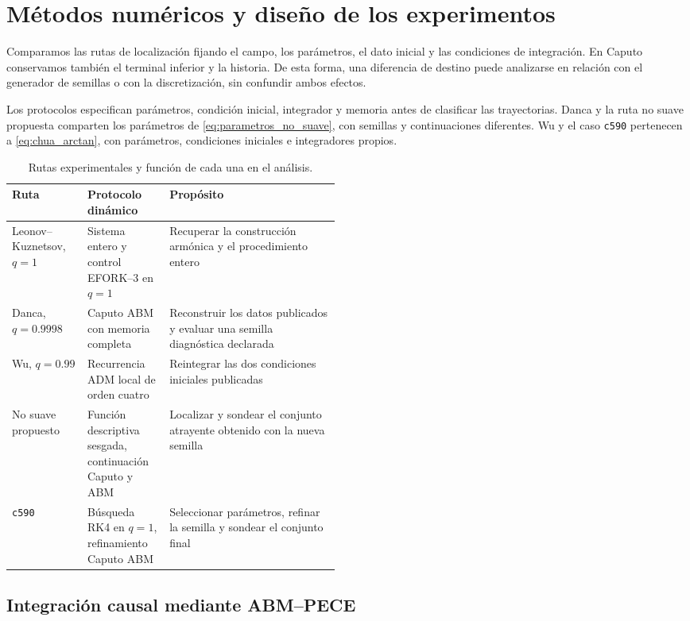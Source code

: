 \section{Métodos numéricos y diseño de los experimentos}

Comparamos las rutas de localización fijando el campo, los parámetros, el
dato inicial y las condiciones de integración. En Caputo conservamos también
el terminal inferior y la historia. De esta forma, una diferencia de destino
puede analizarse en relación con el generador de semillas o con la
discretización, sin confundir ambos efectos.
\label{sec:protocolos}

\HAFOCardProtocols

Los protocolos especifican parámetros, condición inicial, integrador y
memoria antes de clasificar las trayectorias. Danca y la ruta no suave
propuesta comparten los parámetros de \cref{eq:parametros_no_suave}, con
semillas y continuaciones diferentes. Wu y el caso \texttt{c590} pertenecen a
\cref{eq:chua_arctan}, con parámetros, condiciones iniciales e integradores
propios.

\begin{table}[H]
\centering
\caption{Rutas experimentales y función de cada una en el análisis.}
\label{tab:carriles_experimentales}
\begin{tabularx}{\linewidth}{L{0.23\linewidth}L{0.25\linewidth}Y}
\toprule
Ruta & Protocolo dinámico & Propósito\\
\midrule
Leonov--Kuznetsov, \(q=1\)
& Sistema entero y control EFORK--3 en \(q=1\)
& Recuperar la construcción armónica y el procedimiento entero\\
Danca, \(q=0.9998\)
& Caputo ABM con memoria completa
& Reconstruir los datos publicados y evaluar una semilla diagnóstica
declarada\\
Wu, \(q=0.99\)
& Recurrencia ADM local de orden cuatro
& Reintegrar las dos condiciones iniciales publicadas\\
No suave propuesto
& Función descriptiva sesgada, continuación Caputo y ABM
& Localizar y sondear el conjunto atrayente obtenido con la nueva semilla\\
\texttt{c590}
& Búsqueda RK4 en \(q=1\), refinamiento Caputo ABM
& Seleccionar parámetros, refinar la semilla y sondear el conjunto final\\
\bottomrule
\end{tabularx}
\end{table}

\subsection{Integración causal mediante ABM--PECE}
\label{subsec:protocolo_abm}

